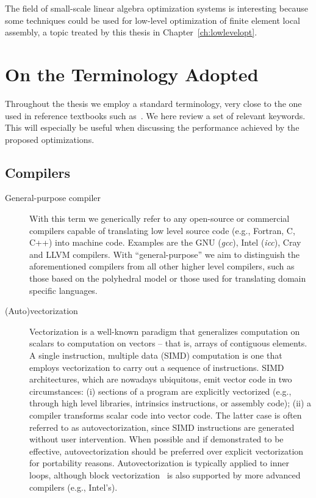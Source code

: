 The field of small-scale linear algebra optimization systems is interesting because some techniques could be used for low-level optimization of finite element local assembly, a topic treated by this thesis in Chapter~\ref{ch:lowlevelopt}.


\section{On the Terminology Adopted}
\label{sec:bkg:terminology}
Throughout the thesis we employ a standard terminology, very close to the one used in reference textbooks such as~\citep{patterson-book}. We here review a set of relevant keywords. This will especially be useful when discussing the performance achieved by the proposed optimizations.



\subsection*{Compilers}

\begin{description}
\item[General-purpose compiler] With this term we generically refer to any open-source or commercial compilers capable of translating low level source code (e.g., Fortran, C, C++) into machine code. Examples are the GNU ({\em gcc}), Intel ({\em icc}), Cray and LLVM compilers. With ``general-purpose'' we aim to distinguish the aforementioned compilers from all other higher level compilers, such as those based on the polyhedral model or those used for translating domain specific languages.

\item[(Auto)vectorization] Vectorization is a well-known paradigm that generalizes computation on scalars to computation on vectors -- that is, arrays of contiguous elements. A single instruction, multiple data (SIMD) computation is one that employs vectorization to carry out a sequence of instructions. SIMD architectures, which are nowadays ubiquitous, emit vector code in two circumstances: (i) sections of a program are explicitly vectorized (e.g., through high level libraries, intrinsics instructions, or assembly code); (ii) a compiler transforms scalar code into vector code. The latter case is often referred to as autovectorization, since SIMD instructions are generated without user intervention. When possible and if demonstrated to be effective, autovectorization should be preferred over explicit vectorization for portability reasons. Autovectorization is typically applied to inner loops, although block vectorization~\citep{SLP-vect} is also supported by more advanced compilers (e.g., Intel's).

\end{description}


